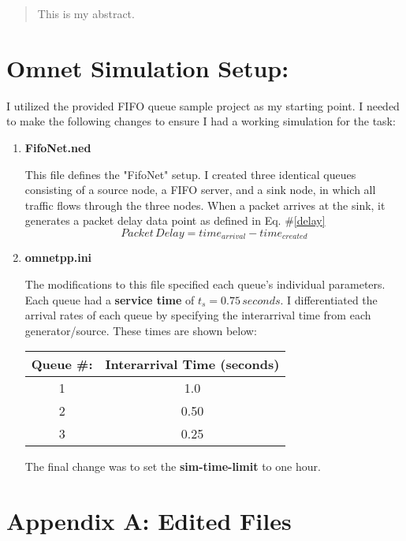 \documentclass{article}
\begin{document}
\begin{abstract}
This is my abstract.
\end{abstract}

\section*{Omnet Simulation Setup:}
I utilized the provided FIFO queue sample project as my starting point.
I needed to make the following changes to ensure I had a working simulation for the task:

\begin{enumerate}
	\item \textbf{FifoNet.ned}  

This file defines the "FifoNet" setup.  I created three identical queues consisting of a source node, a FIFO server, and a sink node, in which all traffic flows through the three nodes.  When a packet arrives at the sink, it generates a packet delay data point as defined in Eq. \#\ref{delay}
\begin{equation}
\label{delay}
Packet \, Delay = time_{arrival} - time_{created}
\end{equation}

	\item \textbf{omnetpp.ini}
	
The modifications to this file specified each queue's individual parameters.  Each queue had a \textbf{service time} of $t_s = 0.75 \, seconds$.
I differentiated the arrival rates of each queue by specifying the interarrival time from each generator/source.
These times are shown below:

\begin{table}[h!]
\centering
\begin{tabular}{|c|c|} \hline
\textbf{Queue \#:} & \textbf{ Interarrival Time (seconds)} \\ \hline
1 & 1.0 \\ \hline
2 & 0.50 \\ \hline
3 & 0.25 \\ \hline
\end{tabular}
\end{table}

The final change was to set the \textbf{sim-time-limit} to one hour.  
\end{enumerate}

\newpage

\section*{Appendix A:  Edited Files}
\end{document}
